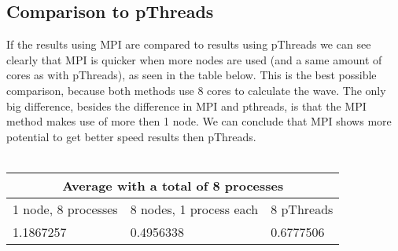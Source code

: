 \documentclass[a4paper]{article}
\begin{document}
    \subsection{Comparison to pThreads}
    If the results using MPI are compared to results using pThreads we can see
    clearly that MPI is quicker when more nodes are used (and a same amount
    of cores as with pThreads), as seen in the table below.
    This is the best possible
    comparison, because both methods use 8 cores to calculate the wave.
    The only big difference,
    besides the difference in MPI and pthreads, is that the MPI method makes use of more then 1 node. We can conclude that MPI shows more potential to get better speed results then pThreads.\\\\
    \begin{tabular}{| p{} | p{} | p{} |}
      \hline
      \multicolumn{3}{|c|}{Average with a total of 8 processes}\\
      \hline
      1 node, 8 processes & 8 nodes, 1 process each & 8 pThreads \\
      \hline
      1.1867257 & 0.4956338 & 0.6777506\\
      \hline
    \end{tabular}
    
    
    
\end{document}
